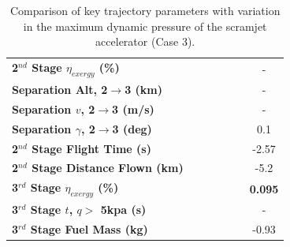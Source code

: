 \begin{table}[ht!]
\begin{tabular}{l c c c c c c}
	\textbf{2$^{nd}$ Stage $\eta_{exergy}$ (\%)}
	& \textbf{\secondExergyEffqFortyFiveNoReturn}
	& \textbf{\secondExergyEffqFortySevenNoReturn}
	& \textbf{\secondExergyEffqStandardNoReturn}
	& \textbf{\secondExergyEffqFiftyTwoNoReturn}
	& \textbf{\secondExergyEffqFiftyFiveNoReturn}
	& -
	\\
	\textbf{Separation Alt, 2$\rightarrow$3 (km)}
	& \secondthirdSeparationAltqFortyFiveNoReturn
	& \secondthirdSeparationAltqFortySevenNoReturn
	& \secondthirdSeparationAltqStandardNoReturn
	& \secondthirdSeparationAltqFiftyTwoNoReturn
	& \secondthirdSeparationAltqFiftyFiveNoReturn
	& -
	\\
	\textbf{Separation $v$, 2$\rightarrow$3 (m/s)}
	& \secondthirdSeparationvqFortyFiveNoReturn
	& \secondthirdSeparationvqFortySevenNoReturn
	& \secondthirdSeparationvqStandardNoReturn
	& \secondthirdSeparationvqFiftyTwoNoReturn
	& \secondthirdSeparationvqFiftyFiveNoReturn
	& -
	\\
	\textbf{Separation $\gamma$, 2$\rightarrow$3 (deg)}
	& \secondthirdSeparationgammaqFortyFiveNoReturn
	& \secondthirdSeparationgammaqFortySevenNoReturn
	& \secondthirdSeparationgammaqStandardNoReturn
	& \secondthirdSeparationgammaqFiftyTwoNoReturn
	& \secondthirdSeparationgammaqFiftyFiveNoReturn
	&0.1
	\\
	\textbf{2$^{nd}$ Stage Flight Time (s)}
	& \secondFlightTimeqFortyFiveNoReturn
	& \secondFlightTimeqFortySevenNoReturn
	& \secondFlightTimeqStandardNoReturn
	& \secondFlightTimeqFiftyTwoNoReturn
	& \secondFlightTimeqFiftyFiveNoReturn
	&-2.57
	\\
	\textbf{2$^{nd}$ Stage Distance Flown (km)}
	& \SecondDistqFortyFiveNoReturn
	& \SecondDistqFortySevenNoReturn
	& \SecondDistqStandardNoReturn
	& \SecondDistqFiftyTwoNoReturn
	& \SecondDistqFiftyFiveNoReturn
	&-5.2
	\\
	\hline 
	\textbf{3$^{rd}$ Stage $\eta_{exergy}$ (\%)}
	& \textbf{\thirddExergyEffqFortyFiveNoReturn}
	& \textbf{\thirddExergyEffqFortySevenNoReturn}
	& \textbf{\thirddExergyEffqStandardNoReturn}
	& \textbf{\thirddExergyEffqFiftyTwoNoReturn}
	& \textbf{\thirddExergyEffqFiftyFiveNoReturn}
	& \textbf{0.095}
	\\
	\textbf{3$^{rd}$ Stage $t$, $q >$ 5kpa (s)}
	& \thirdqOverFiveqFortyFiveNoReturn
	& \thirdqOverFiveqFortySevenNoReturn
	& \thirdqOverFiveqStandardNoReturn
	& \thirdqOverFiveqFiftyTwoNoReturn
	& \thirdqOverFiveqFiftyFiveNoReturn
	& -
	\\
	\textbf{3$^{rd}$ Stage Fuel Mass (kg)}
	& \thirdmFuelqFortyFiveNoReturn
	& \thirdmFuelqFortySevenNoReturn
	& \thirdmFuelqStandardNoReturn
	& \thirdmFuelqFiftyTwoNoReturn
	& \thirdmFuelqFiftyFiveNoReturn
	&-0.93
	\\
	\hline 
\end{tabular}  
	\caption{Comparison of key trajectory parameters with variation in the maximum dynamic pressure of the scramjet accelerator (Case 3).}
	\label{tab:qvarnoreturn}
\end{table}





